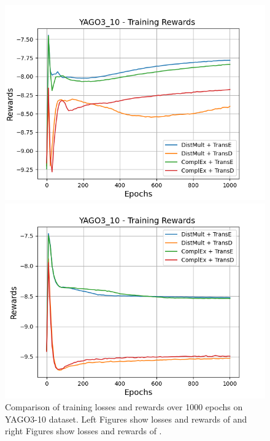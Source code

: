 \begin{figure}[H]
\begin{minipage}{.5\textwidth}
    \end{minipage}
    \begin{minipage}{.5\textwidth}
      \centering
      \includegraphics[width=0.9\linewidth]{figures/results/gan_train/not_pretrained/random/yago3_10/1k_epochs/random_yago3_10_rew.png}
    \end{minipage}%
    \begin{minipage}{.5\textwidth}
      \centering
      \includegraphics[width=0.9\linewidth]{figures/results/gan_train/not_pretrained/uncertainty/max_distribution/entropy/yago3_10/1k_epochs/uncertainty_yago3_10_rew.png}
    \end{minipage}%
    \caption{Comparison of training losses and rewards over 1000 epochs on \textsc{YAGO3-10}  dataset.
    Left Figures show losses and rewards of \origsampling and right Figures show losses and rewards of \ussoftmax.}
    \label{fig:advtrain_yago3_10_losses_rewards}
\end{figure}
